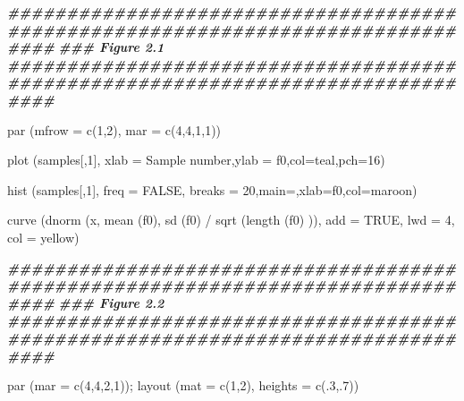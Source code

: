 \documentclass[
]{book}
\newenvironment{Shaded}{\begin{snugshade}}{\end{snugshade}}
\newcommand{\AttributeTok}[1]{\textcolor[rgb]{0.77,0.63,0.00}{#1}}
\newcommand{\ConstantTok}[1]{\textcolor[rgb]{0.00,0.00,0.00}{#1}}
\newcommand{\DecValTok}[1]{\textcolor[rgb]{0.00,0.00,0.81}{#1}}
\newcommand{\DocumentationTok}[1]{\textcolor[rgb]{0.56,0.35,0.01}{\textbf{\textit{#1}}}}
\newcommand{\FunctionTok}[1]{\textcolor[rgb]{0.00,0.00,0.00}{#1}}
\newcommand{\NormalTok}[1]{#1}
\newcommand{\SpecialCharTok}[1]{\textcolor[rgb]{0.00,0.00,0.00}{#1}}
\newcommand{\StringTok}[1]{\textcolor[rgb]{0.31,0.60,0.02}{#1}}
\begin{document}
\begin{Shaded}
\begin{Highlighting}[]
\DocumentationTok{\#\#\#\#\#\#\#\#\#\#\#\#\#\#\#\#\#\#\#\#\#\#\#\#\#\#\#\#\#\#\#\#\#\#\#\#\#\#\#\#\#\#\#\#\#\#\#\#\#\#\#\#\#\#\#\#\#\#\#\#\#\#\#\#\#\#\#\#\#\#\#\#\#\#\#\#\#\#\#\#}
\DocumentationTok{\#\#\# Figure 2.1}
\DocumentationTok{\#\#\#\#\#\#\#\#\#\#\#\#\#\#\#\#\#\#\#\#\#\#\#\#\#\#\#\#\#\#\#\#\#\#\#\#\#\#\#\#\#\#\#\#\#\#\#\#\#\#\#\#\#\#\#\#\#\#\#\#\#\#\#\#\#\#\#\#\#\#\#\#\#\#\#\#\#\#\#\#}

\FunctionTok{par}\NormalTok{ (}\AttributeTok{mfrow =} \FunctionTok{c}\NormalTok{(}\DecValTok{1}\NormalTok{,}\DecValTok{2}\NormalTok{), }\AttributeTok{mar =} \FunctionTok{c}\NormalTok{(}\DecValTok{4}\NormalTok{,}\DecValTok{4}\NormalTok{,}\DecValTok{1}\NormalTok{,}\DecValTok{1}\NormalTok{))}

\FunctionTok{plot}\NormalTok{ (samples[,}\DecValTok{1}\NormalTok{], }\AttributeTok{xlab =} \StringTok{\textquotesingle{}Sample number\textquotesingle{}}\NormalTok{,}\AttributeTok{ylab =} \StringTok{\textquotesingle{}f0\textquotesingle{}}\NormalTok{,}\AttributeTok{col=}\NormalTok{teal,}\AttributeTok{pch=}\DecValTok{16}\NormalTok{)}

\FunctionTok{hist}\NormalTok{ (samples[,}\DecValTok{1}\NormalTok{], }\AttributeTok{freq =} \ConstantTok{FALSE}\NormalTok{, }\AttributeTok{breaks =} \DecValTok{20}\NormalTok{,}\AttributeTok{main=}\StringTok{\textquotesingle{}\textquotesingle{}}\NormalTok{,}\AttributeTok{xlab=}\StringTok{\textquotesingle{}f0\textquotesingle{}}\NormalTok{,}\AttributeTok{col=}\NormalTok{maroon)}

\FunctionTok{curve}\NormalTok{ (}\FunctionTok{dnorm}\NormalTok{ (x, }\FunctionTok{mean}\NormalTok{ (f0), }\FunctionTok{sd}\NormalTok{ (f0) }\SpecialCharTok{/} \FunctionTok{sqrt}\NormalTok{ (}\FunctionTok{length}\NormalTok{ (f0) )), }\AttributeTok{add =} \ConstantTok{TRUE}\NormalTok{,}
       \AttributeTok{lwd =} \DecValTok{4}\NormalTok{, }\AttributeTok{col =}\NormalTok{ yellow)}

\DocumentationTok{\#\#\#\#\#\#\#\#\#\#\#\#\#\#\#\#\#\#\#\#\#\#\#\#\#\#\#\#\#\#\#\#\#\#\#\#\#\#\#\#\#\#\#\#\#\#\#\#\#\#\#\#\#\#\#\#\#\#\#\#\#\#\#\#\#\#\#\#\#\#\#\#\#\#\#\#\#\#\#\#}
\DocumentationTok{\#\#\# Figure 2.2}
\DocumentationTok{\#\#\#\#\#\#\#\#\#\#\#\#\#\#\#\#\#\#\#\#\#\#\#\#\#\#\#\#\#\#\#\#\#\#\#\#\#\#\#\#\#\#\#\#\#\#\#\#\#\#\#\#\#\#\#\#\#\#\#\#\#\#\#\#\#\#\#\#\#\#\#\#\#\#\#\#\#\#\#\#}

\FunctionTok{par}\NormalTok{ (}\AttributeTok{mar =} \FunctionTok{c}\NormalTok{(}\DecValTok{4}\NormalTok{,}\DecValTok{4}\NormalTok{,}\DecValTok{2}\NormalTok{,}\DecValTok{1}\NormalTok{)); }\FunctionTok{layout}\NormalTok{ (}\AttributeTok{mat =} \FunctionTok{c}\NormalTok{(}\DecValTok{1}\NormalTok{,}\DecValTok{2}\NormalTok{), }\AttributeTok{heights =} \FunctionTok{c}\NormalTok{(.}\DecValTok{3}\NormalTok{,.}\DecValTok{7}\NormalTok{))}


\end{Highlighting}
\end{Shaded}
\end{document}
